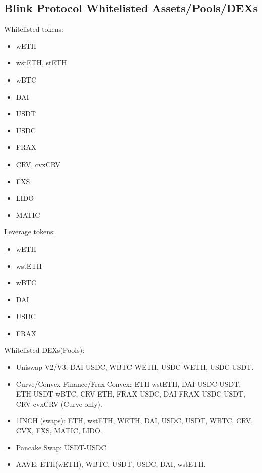 \documentclass[conference]{IEEEtran}
\begin{document}



\newpage

\begin{appendices}
\section{Blink Protocol Whitelisted Assets/Pools/DEXs}
Whitelisted tokens:
\begin{itemize}
	\item wETH
	\item wstETH, stETH
	\item wBTC
	\item DAI
	\item USDT
	\item USDC
	\item FRAX
	\item CRV, cvxCRV
	\item FXS
	\item LIDO
	\item MATIC
\end{itemize}
Leverage tokens: 
\begin{itemize}
	\item wETH
	\item wstETH
	\item wBTC
	\item DAI
	\item USDC
	\item FRAX
\end{itemize}
Whitelisted DEXs(Pools):
\begin{itemize}
	\item Uniswap V2/V3: DAI-USDC, WBTC-WETH, USDC-WETH, USDC-USDT.
	\item Curve/Convex Finance/Frax Convex: ETH-wstETH, DAI-USDC-USDT, ETH-USDT-wBTC, CRV-ETH, FRAX-USDC, DAI-FRAX-USDC-USDT, CRV-cvxCRV (Curve only).
	\item 1INCH (swaps): ETH, wstETH, WETH, DAI, USDC, USDT, WBTC, CRV, CVX, FXS, MATIC, LIDO.
	\item Pancake Swap: USDT-USDC
	\item AAVE: ETH(wETH), WBTC, USDT, USDC, DAI, wstETH.
\end{itemize}




\end{appendices}
\end{document}
